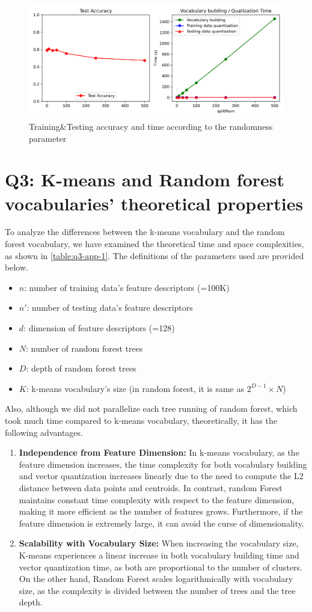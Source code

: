 \begin{figure}[htbp]
	\centering
	\includegraphics[width=0.5\linewidth]{image/q3-fig5.png}
	\caption{Training\&Testing accuracy and time according to the randomness parameter}
	\label{fig:q3-app-fig2}
\end{figure}

\section{Q3: K-means and Random forest vocabularies' theoretical properties}
\label{subsec:Q3-app1}
To analyze the differences between the k-means vocabulary and the random forest vocabulary, we have examined the theoretical time and space complexities, as shown in \cref{table:q3-app-1}. The definitions of the parameters used are provided below.
\begin{itemize}
	\item $n$: number of training data's feature descriptors (=100K)
	\item $n'$: number of testing data's feature descriptors
	\item $d$: dimension of feature descriptors (=128)
	\item $N$: number of random forest trees
	\item $D$: depth of random forest trees
	\item $K$: k-means vocabulary's size (in random forest, it is same as $2^{D-1} \times N$)
\end{itemize}

Also, although we did not parallelize each tree running of random forest, which took much time compared to k-means vocabulary, theoretically, it has the following advantages. 
\begin{enumerate}
	\item \textbf{Independence from Feature Dimension:} 
	In k-means vocabulary, as the feature dimension increases, the time complexity for both vocabulary building and vector quantization increases linearly due to the need to compute the L2 distance between data points and centroids. In contrast, random Forest maintains constant time complexity with respect to the feature dimension, making it more efficient as the number of features grows. Furthermore, if the feature dimension is extremely large, it can avoid the curse of dimensionality.
	
	\item \textbf{Scalability with Vocabulary Size:} 
	When increasing the vocabulary size, K-means experiences a linear increase in both vocabulary building time and vector quantization time, as both are proportional to the number of clusters. On the other hand, Random Forest scales logarithmically with vocabulary size, as the complexity is divided between the number of trees and the tree depth.
\end{enumerate}


